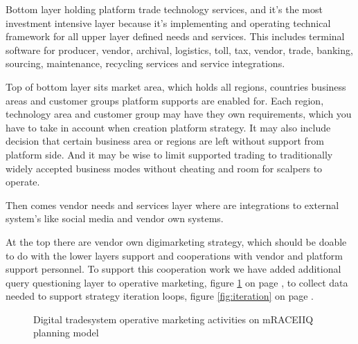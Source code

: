 Bottom layer holding platform trade technology services, and it's the most
investment intensive layer because it's implementing and operating technical
framework for all upper layer defined needs and services. This includes
terminal software for producer, vendor, archival, logistics, toll, tax,
vendor, trade, banking, sourcing, maintenance, recycling services and
service integrations.

Top of bottom layer sits market area, which holds all regions, countries
business areas and customer groups platform supports are enabled for. Each
region, technology area and customer group may have they own requirements,
which you have to take in account when creation platform strategy. It may also
include decision that certain business area or regions are left without
support from platform side. And it may be wise to limit supported trading to
traditionally widely accepted business modes without cheating and room for
scalpers to operate.

Then comes vendor needs and services layer where are integrations to external
system's like social media and vendor own systems.

At the top there are vendor own digimarketing strategy, which should be doable
to do with the lower layers support and cooperations with vendor and platform
support personnel. To support this cooperation work we have added additional
query questioning layer to operative marketing, figure \ref{fig:mRACEIIQ} on
page \pageref{fig:mRACEIIQ}, to collect data needed to support strategy
iteration loops, figure \ref{fig:iteration} on page \pageref{fig:iteration}.


\begin{figure}
 \begin{center}
  \caption{Digital tradesystem operative marketing activities on mRACEIIQ planning model}
  \label{fig:mRACEIIQ}
 \end{center}
\end{figure}


